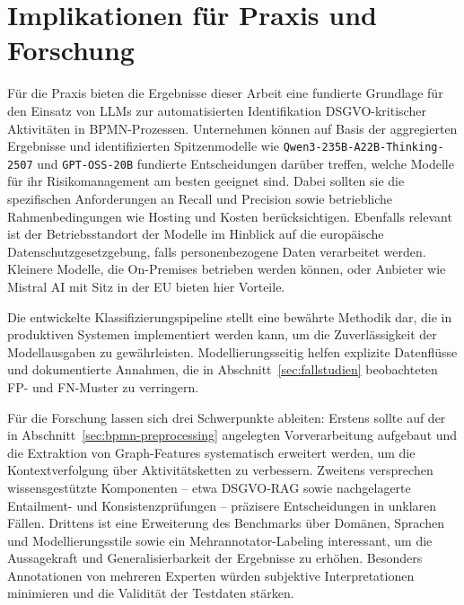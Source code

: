 \section{Implikationen für Praxis und Forschung}\label{sec:implikationen-fur-praxis-und-forschung}

Für die Praxis bieten die Ergebnisse dieser Arbeit eine fundierte Grundlage für den Einsatz von \acp{LLM} zur automatisierten Identifikation \ac{DSGVO}-kritischer Aktivitäten in \ac{BPMN}-Prozessen. Unternehmen können auf Basis der aggregierten Ergebnisse und identifizierten Spitzenmodelle wie \texttt{Qwen3-235B-A22B-Thinking-2507} und \texttt{GPT-OSS-20B} fundierte Entscheidungen darüber treffen, welche Modelle für ihr Risikomanagement am besten geeignet sind. Dabei sollten sie die spezifischen Anforderungen an Recall und Precision sowie betriebliche Rahmenbedingungen wie Hosting und Kosten berücksichtigen. Ebenfalls relevant ist der Betriebsstandort der Modelle im Hinblick auf die europäische Datenschutzgesetzgebung, falls personenbezogene Daten verarbeitet werden. Kleinere Modelle, die On-Premises betrieben werden können, oder Anbieter wie Mistral AI mit Sitz in der \ac{EU} bieten hier Vorteile.

Die entwickelte Klassifizierungspipeline stellt eine bewährte Methodik dar, die in produktiven Systemen implementiert werden kann, um die Zuverlässigkeit der Modellausgaben zu gewährleisten. Modellierungsseitig helfen explizite Datenflüsse und dokumentierte Annahmen, die in Abschnitt~\ref{sec:fallstudien} beobachteten \ac{FP}- und \ac{FN}-Muster zu verringern.

Für die Forschung lassen sich drei Schwerpunkte ableiten: Erstens sollte auf der in Abschnitt~\ref{sec:bpmn-preprocessing} angelegten Vorverarbeitung aufgebaut und die Extraktion von Graph-Features systematisch erweitert werden, um die Kontextverfolgung über Aktivitätsketten zu verbessern. Zweitens versprechen wissensgestützte Komponenten – etwa \ac{DSGVO}-\ac{RAG} sowie nachgelagerte Entailment- und Konsistenzprüfungen – präzisere Entscheidungen in unklaren Fällen. Drittens ist eine Erweiterung des Benchmarks über Domänen, Sprachen und Modellierungsstile sowie ein Mehrannotator-Labeling interessant, um die Aussagekraft und Generalisierbarkeit der Ergebnisse zu erhöhen. Besonders Annotationen von mehreren Experten würden subjektive Interpretationen minimieren und die Validität der Testdaten stärken.